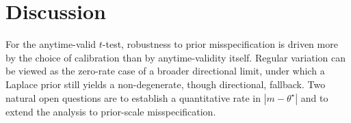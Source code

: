 \documentclass{article}
\begin{document}
\vspace{-4pt}
\section{Discussion}
\label{sec:discussion}\vspace{-4pt}
For the anytime-valid $t$-test, robustness to prior misspecification is driven more by the choice of calibration than by anytime-validity itself. Regular variation can be viewed as the zero-rate case of a broader directional limit, under which a Laplace prior still yields a non-degenerate, though directional, fallback. Two natural open questions are to establish a quantitative rate in $|m-\theta^\star|$ and to extend the analysis to prior-scale misspecification.
\end{document}
